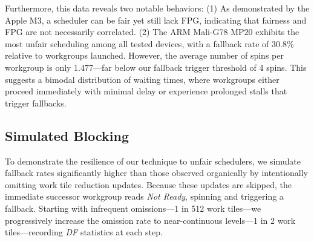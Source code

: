 \documentclass[acmsmall, manuscript, screen, review, anonymous]{acmart}
\begin{document}
Furthermore, this data reveals two notable behaviors: (1) As demonstrated by the Apple M3, a scheduler can be fair yet still lack FPG, indicating that fairness and FPG are not necessarily correlated. (2) The ARM Mali-G78 MP20 exhibits the most unfair scheduling among all tested devices, with a fallback rate of 30.8\% relative to workgroups launched. However, the average number of spins per workgroup is only 1.477---far below our fallback trigger threshold of 4 spins. This suggests a bimodal distribution of waiting times, where workgroups either proceed immediately with minimal delay or experience prolonged stalls that trigger fallbacks.

\subsection{Simulated Blocking}%
\label{sec:Sim-Blocking}
To demonstrate the resilience of our technique to unfair schedulers, we simulate fallback rates significantly higher than those observed organically by intentionally omitting work tile reduction updates. Because these updates are skipped, the immediate successor workgroup reads \emph{Not Ready}, spinning and triggering a fallback. Starting with infrequent omissions---1 in 512 work tiles---we progressively increase the omission rate to near-continuous levels---1 in 2 work tiles---recording \emph{DF} statistics at each step.
\end{document}
